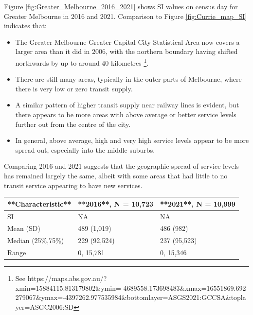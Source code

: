 \documentclass[preprint, 3p,
authoryear]{elsarticle} %
\providecommand{\tightlist}{%
  \setlength{\itemsep}{0pt}\setlength{\parskip}{0pt}}
\begin{document}
Figure \ref{fig:Greater_Melbourne_2016_2021} shows SI values on census
day for Greater Melbourne in 2016 and 2021. Comparison to Figure
\ref{fig:Currie_map_SI} indicates that:

\begin{itemize}
\tightlist
\item
  The Greater Melbourne Greater Capital City Statistical Area now covers
  a larger area than it did in 2006, with the northern boundary having
  shifted northwards by up to around 40 kilometres \footnote{See
    https://maps.abs.gov.au/?xmin=15884115.813179802\&ymin=-4689558.173698483\&xmax=16551869.692279067\&ymax=-4397262.977535984\&bottomlayer=ASGS2021:GCCSA\&toplayer=ASGC2006:SD}.
\item
  There are still many areas, typically in the outer parts of Melbourne,
  where there is very low or zero transit supply.
\item
  A similar pattern of higher transit supply near railway lines is
  evident, but there appears to be more areas with above average or
  better service levels further out from the centre of the city.
\item
  In general, above average, high and very high service levels appear to
  be more spread out, especially into the middle suburbs.
\end{itemize}

Comparing 2016 and 2021 suggests that the geographic spread of service
levels has remained largely the same, albeit with some areas that had
little to no transit service appearing to have new services.

\begin{tabular}{l|l|l}
\hline
**Characteristic** & **2016**, N = 10,723 & **2021**, N = 10,999\\
\hline
SI & NA & NA\\
\hline
Mean (SD) & 489 (1,019) & 486 (982)\\
\hline
Median (25\%,75\%) & 229 (92,524) & 237 (95,523)\\
\hline
Range & 0, 15,781 & 0, 15,346\\
\hline
\end{tabular}
\end{document}
